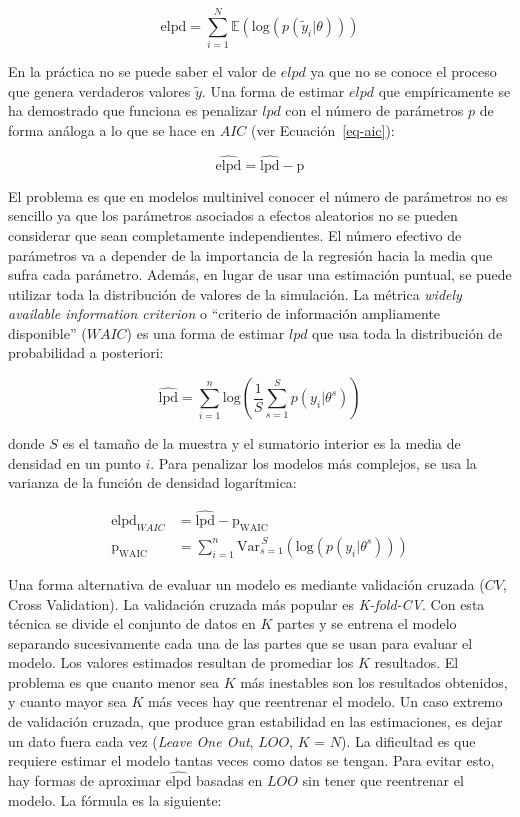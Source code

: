 \documentclass[
  12pt,
  a4paper,
  extrafontsizes,
  onecolumn,
  openright,
  table]{memoir}
\begin{document}
\[
\mathrm{elpd} = \sum_{i=1}^{N} \mathbb{E}(\mathrm{log} (p(\tilde{y}_i | \theta)))
\]

En la práctica no se puede saber el valor de \(elpd\) ya que no se
conoce el proceso que genera verdaderos valores \(\tilde{y}\). Una forma
de estimar \(elpd\) que empíricamente se ha demostrado que funciona es
penalizar \(lpd\) con el número de parámetros \(p\) de forma análoga a
lo que se hace en \(AIC\) (ver Ecuación~\ref{eq-aic}):

\[
\widehat{\mathrm{elpd}} = \widehat{\mathrm{lpd}} - \mathrm{p}
\]

El problema es que en modelos multinivel conocer el número de parámetros
no es sencillo ya que los parámetros asociados a efectos aleatorios no
se pueden considerar que sean completamente independientes. El número
efectivo de parámetros va a depender de la importancia de la regresión
hacia la media que sufra cada parámetro. Además, en lugar de usar una
estimación puntual, se puede utilizar toda la distribución de valores de
la simulación. La métrica \emph{widely available information criterion}
o \enquote{criterio de información ampliamente disponible} (\(WAIC\)) es
una forma de estimar \(lpd\) que usa toda la distribución de
probabilidad a posteriori:

\[
\widehat{\mathrm{lpd}} = \sum_{i=1}^{n} \mathrm{log} (\frac{1}{S} \sum_{s=1}^{S} p(y_{i} | \theta^s))
\]

donde \(S\) es el tamaño de la muestra y el sumatorio interior es la
media de densidad en un punto \(i\). Para penalizar los modelos más
complejos, se usa la varianza de la función de densidad logarítmica:

\[
\begin{aligned}
\widehat{\mathrm{elpd}}_{WAIC} &= \widehat{\mathrm{lpd}} - \mathrm{p_{WAIC}} \\
\mathrm{p_{\mathrm{WAIC}}} &= \sum_{i=1}^{n} \mathrm{Var}_{s=1}^{\,S}(\mathrm{log} (p(y_{i} | \theta^s)))
\end{aligned}
\]

Una forma alternativa de evaluar un modelo es mediante validación
cruzada (\(CV\), Cross Validation). La validación cruzada más popular es
\emph{K-fold-CV}. Con esta técnica se divide el conjunto de datos en
\(K\) partes y se entrena el modelo separando sucesivamente cada una de
las partes que se usan para evaluar el modelo. Los valores estimados
resultan de promediar los \(K\) resultados. El problema es que cuanto
menor sea \(K\) más inestables son los resultados obtenidos, y cuanto
mayor sea \(K\) más veces hay que reentrenar el modelo. Un caso extremo
de validación cruzada, que produce gran estabilidad en las estimaciones,
es dejar un dato fuera cada vez (\emph{Leave One Out}, \(LOO\), \(K\) =
\(N\)). La dificultad es que requiere estimar el modelo tantas veces
como datos se tengan. Para evitar esto, hay formas de aproximar
\(\widehat{\mathrm{elpd}}\) basadas en \(LOO\) sin tener que reentrenar
el modelo. La fórmula es la siguiente:
\end{document}
